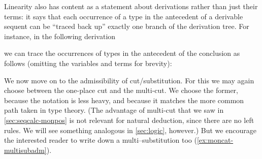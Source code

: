Linearity also has content as a statement about derivations rather than just their terms: it says that each occurrence of a type in the antecedent of a derivable sequent can be ``traced back up'' exactly one branch of the derivation tree.
For instance, in the following derivation
\begin{mathpar}
\end{mathpar}
we can trace the occurrences of types in the antecedent of the conclusion as follows (omitting the variables and terms for brevity):
\begin{mathpar}
\end{mathpar}

We now move on to the admissibility of cut/substitution.
For this we may again choose between the one-place cut and the multi-cut.
We choose the former, because the notation is less heavy, and because it matches the more common path taken in type theory.
(The advantage of multi-cut that we saw in \cref{sec:seqcalc-monpos} is not relevant for natural deduction, since there are no left rules.
We will see something analogous in \cref{sec:logic}, however.)
But we encourage the interested reader to write down a multi--substitution too (\cref{ex:moncat-multisubadm}).


